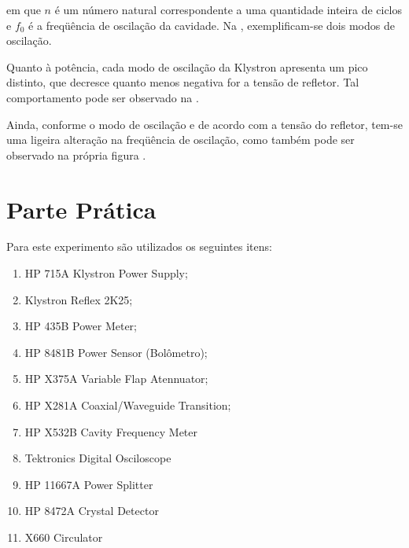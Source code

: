 \documentclass[a4paper,12pt]{article}
\begin{document}
\noindent em que $n$ é um número natural correspondente a uma quantidade inteira de ciclos e $f_0$ é a freqüência de oscilação da cavidade. Na , exemplificam-se dois modos de oscilação.
    

    Quanto à potência, cada modo de oscilação da Klystron apresenta um pico distinto, que decresce quanto menos negativa for a tensão de refletor. Tal comportamento pode ser observado na .

    Ainda, conforme o modo de oscilação e de acordo com a tensão do refletor, tem-se uma ligeira alteração na freqüência de oscilação, como também pode ser observado na própria figura .



    \pagebreak
    \section{Parte Prática}

    \bigskip
    
    Para este experimento são utilizados os seguintes itens:

    \begin{enumerate}
        \item HP 715A Klystron Power Supply;
        \item Klystron Reflex 2K25;
        \item HP 435B Power Meter;
        \item HP 8481B Power Sensor (Bolômetro);
        \item HP X375A Variable Flap Atennuator;
        \item HP X281A Coaxial/Waveguide Transition;
        \item HP X532B Cavity Frequency Meter
        \item Tektronics Digital Osciloscope
        \item HP 11667A Power Splitter
        \item HP 8472A Crystal Detector
        \item X660 Circulator
    \end{enumerate}
\end{document}
